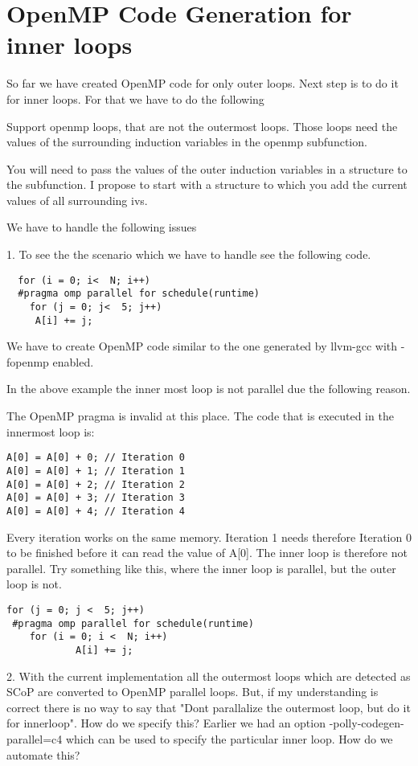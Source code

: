 \documentclass[a4paper,10pt]{article}
\begin{document}
\section{OpenMP Code Generation for inner loops}

So far we have created OpenMP code for only outer loops. Next step is to do it for inner loops. For that we have to do the following

Support openmp loops, that are not the outermost loops. Those loops
need the values of the surrounding induction variables in the openmp
subfunction.

You will need to pass the values of the outer induction variables in a structure to the subfunction. I propose to start with a structure to which you add the current values of all surrounding ivs.

We have to handle the following issues

1. To see the the scenario which we have to handle see the following code. 
\begin{verbatim}
  for (i = 0; i<  N; i++)
  #pragma omp parallel for schedule(runtime)
    for (j = 0; j<  5; j++)
     A[i] += j;

\end{verbatim}

We have to create OpenMP code similar to the one generated by llvm-gcc with -fopenmp enabled.

In the above example the inner most loop is not parallel due the following reason.

The OpenMP pragma is invalid at this place. The code that is executed in the innermost loop is:

\begin{verbatim}
A[0] = A[0] + 0; // Iteration 0
A[0] = A[0] + 1; // Iteration 1
A[0] = A[0] + 2; // Iteration 2
A[0] = A[0] + 3; // Iteration 3
A[0] = A[0] + 4; // Iteration 4
\end{verbatim}
Every iteration works on the same memory. Iteration 1 needs therefore Iteration 0 to be finished before it can read the value of A[0].
The inner loop is therefore not parallel. Try something like this, where the inner loop is parallel, but the outer loop is not.


\begin{verbatim}
for (j = 0; j <  5; j++)
 #pragma omp parallel for schedule(runtime)
    for (i = 0; i <  N; i++)
            A[i] += j;
\end{verbatim}
2. With the current implementation all the outermost loops which are
detected as SCoP are converted to OpenMP parallel loops. But, if my
understanding is correct there is no way to say that "Dont parallalize
the outermost loop, but do it for innerloop". How do we specify this?
Earlier we had an option -polly-codegen-parallel=c4 which can be used to
specify the particular inner loop. How do we automate this?
\end{document}
